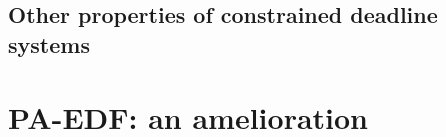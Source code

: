 \documentclass[a4paper,10pt]{article}
\begin{document}
    \subsection{Other properties of constrained deadline systems}

\section{PA-EDF: an amelioration}

\nocite{*}


\end{document}

